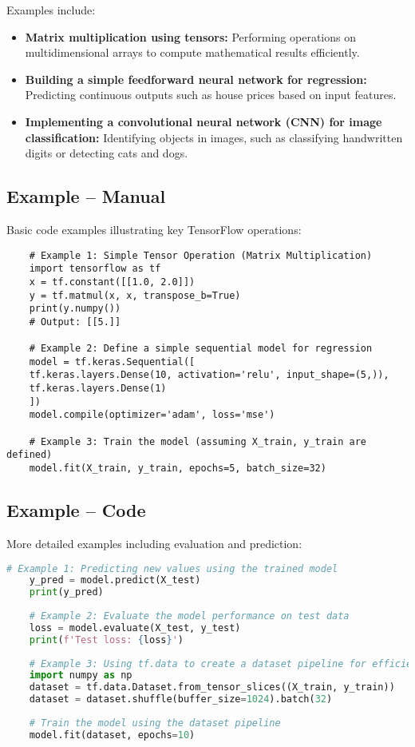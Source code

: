Examples include:
\begin{itemize}
	\item \textbf{Matrix multiplication using tensors:} Performing operations on multidimensional arrays to compute mathematical results efficiently.
	\item \textbf{Building a simple feedforward neural network for regression:} Predicting continuous outputs such as house prices based on input features.
	\item \textbf{Implementing a convolutional neural network (CNN) for image classification:} Identifying objects in images, such as classifying handwritten digits or detecting cats and dogs.
\end{itemize}

\subsection{Example -- Manual}
Basic code examples illustrating key TensorFlow operations:

\begin{verbatim}
	# Example 1: Simple Tensor Operation (Matrix Multiplication)
	import tensorflow as tf
	x = tf.constant([[1.0, 2.0]])
	y = tf.matmul(x, x, transpose_b=True)
	print(y.numpy())
	# Output: [[5.]]
	
	# Example 2: Define a simple sequential model for regression
	model = tf.keras.Sequential([
	tf.keras.layers.Dense(10, activation='relu', input_shape=(5,)),
	tf.keras.layers.Dense(1)
	])
	model.compile(optimizer='adam', loss='mse')
	
	# Example 3: Train the model (assuming X_train, y_train are defined)
	model.fit(X_train, y_train, epochs=5, batch_size=32)
\end{verbatim}

\subsection{Example -- Code}
More detailed examples including evaluation and prediction:

\begin{lstlisting}[language=python, basicstyle=\ttfamily\small]
	# Example 1: Predicting new values using the trained model
	y_pred = model.predict(X_test)
	print(y_pred)
	
	# Example 2: Evaluate the model performance on test data
	loss = model.evaluate(X_test, y_test)
	print(f'Test loss: {loss}')
	
	# Example 3: Using tf.data to create a dataset pipeline for efficient training
	import numpy as np
	dataset = tf.data.Dataset.from_tensor_slices((X_train, y_train))
	dataset = dataset.shuffle(buffer_size=1024).batch(32)
	
	# Train the model using the dataset pipeline
	model.fit(dataset, epochs=10)
\end{lstlisting}


